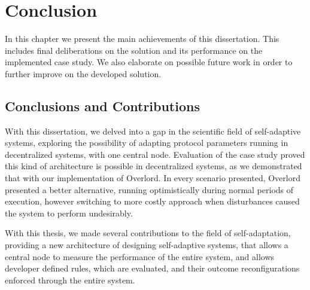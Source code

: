 
%

\chapter{Conclusion}
\label{cha:conclusion}


\epigraphfontsize{\small\itshape}
\setlength\epigraphwidth{12.5cm}
\setlength\epigraphrule{0pt}
%
%
%

In this chapter we present the main achievements of this dissertation. This includes final deliberations on the solution and its performance on the implemented case study. We also elaborate on possible future work in order to further improve on the developed solution.

\section{Conclusions and Contributions}
\label{sec:conclusions_and_contributions}
With this dissertation, we delved into a gap in the scientific field of self-adaptive systems, exploring the possibility of adapting protocol parameters running in decentralized systems, with one central node. Evaluation of the case study proved this kind of architecture is possible in decentralized systems, as we demonstrated that with our implementation of Overlord. In every scenario presented, Overlord presented a better alternative, running optimistically during normal periods of execution, however switching to more costly approach when disturbances caused the system to perform undesirably.

With this thesis, we made several contributions to the field of self-adaptation, providing a new architecture of designing self-adaptive systems, that allows a central node to measure the performance of the entire system, and allows developer defined rules, which are evaluated, and their outcome reconfigurations enforced through the entire system.

